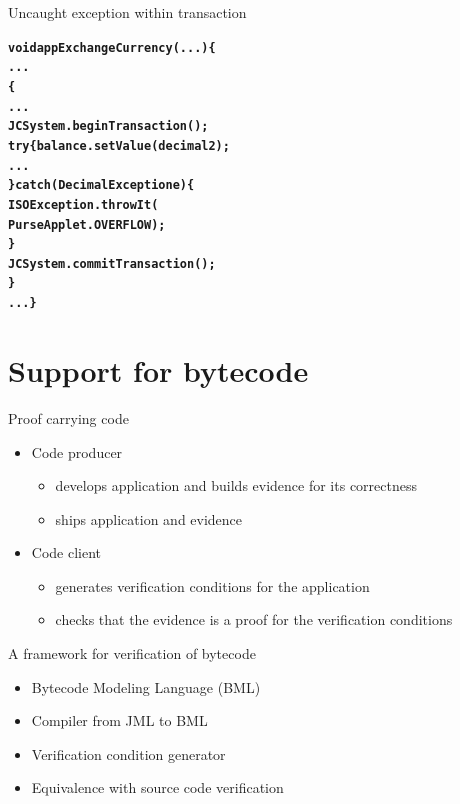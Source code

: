 \documentclass[final,nocolorBG,a4,mobius,nototal,pdf,slideColor]{prosper}
\begin{document}
\begin{slide}{Uncaught exception within transaction}
\begin{alltt}
\textbf{void appExchangeCurrency(...) \{
   ...
    \{
      ...
      JCSystem.beginTransaction();	
      try \{balance.setValue(decimal2);
            ...
      \} catch (DecimalException e) \{
         ISOException.throwIt(
              PurseApplet.OVERFLOW);
      \}
      JCSystem.commitTransaction();
   \}
   ...\}}
\end{alltt}
\end{slide}

\part{Support for bytecode}
\begin{slide}{Proof carrying code}
\begin{itemize}
\item Code producer 
 \begin{itemize}
 \item develops application and builds evidence for its correctness 
 \item ships application and evidence 
 \end{itemize}
\item Code client  
 \begin{itemize}
 \item generates verification conditions for the application
 \item checks that the evidence is a proof for the verification
conditions  
 \end{itemize}
\end{itemize}
\end{slide}

\begin{slide}{A framework for verification of bytecode}
 \begin{itemize}
 \item Bytecode Modeling Language (BML)
 \item Compiler from JML to BML
 \item Verification condition generator
 \item Equivalence with source code verification
 \end{itemize}
\end{slide}
\end{document}
